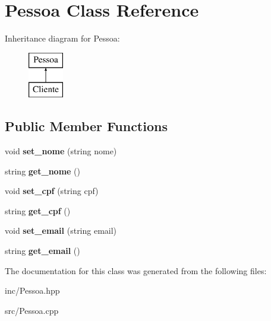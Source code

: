\hypertarget{class_pessoa}{}\section{Pessoa Class Reference}
\label{class_pessoa}
Inheritance diagram for Pessoa\+:\begin{figure}[H]
\begin{center}
\leavevmode
\includegraphics[height=2.000000cm]{class_pessoa}
\end{center}
\end{figure}
\subsection*{Public Member Functions}
\begin{DoxyCompactItemize}
\item 
void {\bfseries set\+\_\+nome} (string nome)\hypertarget{class_pessoa_ade7bf4832051a8b35b2531632c986b7a}{}\label{class_pessoa_ade7bf4832051a8b35b2531632c986b7a}

\item 
string {\bfseries get\+\_\+nome} ()\hypertarget{class_pessoa_a7fc758a1ba17e56d95dfbbc1e65cbedf}{}\label{class_pessoa_a7fc758a1ba17e56d95dfbbc1e65cbedf}

\item 
void {\bfseries set\+\_\+cpf} (string cpf)\hypertarget{class_pessoa_ae7fa0ed8427a1674ac87efd327aa2009}{}\label{class_pessoa_ae7fa0ed8427a1674ac87efd327aa2009}

\item 
string {\bfseries get\+\_\+cpf} ()\hypertarget{class_pessoa_a95123b811bca5c1d4c72233b29f227dd}{}\label{class_pessoa_a95123b811bca5c1d4c72233b29f227dd}

\item 
void {\bfseries set\+\_\+email} (string email)\hypertarget{class_pessoa_a829da31a467d19d469925370301c34bd}{}\label{class_pessoa_a829da31a467d19d469925370301c34bd}

\item 
string {\bfseries get\+\_\+email} ()\hypertarget{class_pessoa_afc904106ca6695d07a382a0300f033ba}{}\label{class_pessoa_afc904106ca6695d07a382a0300f033ba}

\end{DoxyCompactItemize}


The documentation for this class was generated from the following files\+:\begin{DoxyCompactItemize}
\item 
inc/Pessoa.\+hpp\item 
src/Pessoa.\+cpp\end{DoxyCompactItemize}
